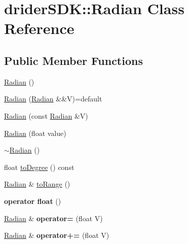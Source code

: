 \hypertarget{classdrider_s_d_k_1_1_radian}{}\section{drider\+S\+DK\+:\+:Radian Class Reference}
\label{classdrider_s_d_k_1_1_radian}
\subsection*{Public Member Functions}
\begin{DoxyCompactItemize}
\item 
\hyperlink{classdrider_s_d_k_1_1_radian_a3e670b9e0a28e363b8b20645e2962c66}{Radian} ()
\item 
\hyperlink{classdrider_s_d_k_1_1_radian_a3f93a33ebb6195d6732bff6262a4c91c}{Radian} (\hyperlink{classdrider_s_d_k_1_1_radian}{Radian} \&\&V)=default
\item 
\hyperlink{classdrider_s_d_k_1_1_radian_a8487633584761b8cabbe182cf26f5168}{Radian} (const \hyperlink{classdrider_s_d_k_1_1_radian}{Radian} \&V)
\item 
\hyperlink{classdrider_s_d_k_1_1_radian_a21d244cf4c918a5658b69dd1b4df2d6e}{Radian} (float value)
\item 
\hyperlink{classdrider_s_d_k_1_1_radian_a9b1711276eed04187623b4cb047c90ce}{$\sim$\+Radian} ()
\item 
float \hyperlink{classdrider_s_d_k_1_1_radian_a2b848dd9f60fbdb8e113620e9933f3d8}{to\+Degree} () const
\item 
\hyperlink{classdrider_s_d_k_1_1_radian}{Radian} \& \hyperlink{classdrider_s_d_k_1_1_radian_a6a7ebb658100e78676dee6ff095122d9}{to\+Range} ()
\item 
\mbox{\label{classdrider_s_d_k_1_1_radian_abcf6e621b7842bf900ef194a0506dcaf}} 
{\bfseries operator float} ()
\item 
\mbox{\label{classdrider_s_d_k_1_1_radian_aca76d9162983d1a6cc372abdc0ae4c33}} 
\hyperlink{classdrider_s_d_k_1_1_radian}{Radian} \& {\bfseries operator=} (float V)
\item 
\mbox{\label{classdrider_s_d_k_1_1_radian_a13e910cd2706b9c5faf6498329267a2c}} 
\hyperlink{classdrider_s_d_k_1_1_radian}{Radian} \& {\bfseries operator+=} (float V)
\item 

\end{DoxyCompactItemize}
